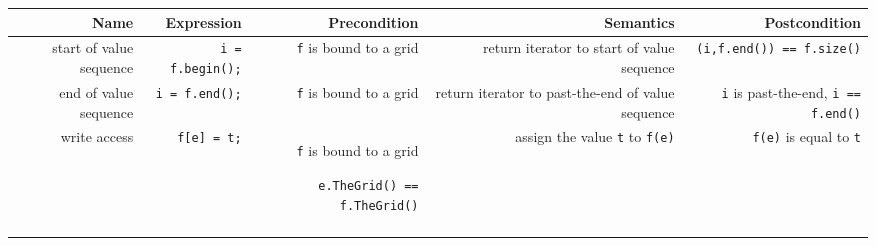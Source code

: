 \begin{tabularx}{15cm}{RRRRR} 
  \hline
  \bf  Name     &
  \bf  Expression &
  \bf  Precondition&
  \bf  Semantics &
  \bf  Postcondition
  \\
  \hline
  start of value sequence  &
  {\tt i = f.begin();} &
  {\tt f} is bound to a grid  &
  return iterator to start of value sequence &
  {\tt  {}(i,f.end()) == f.size()}
  \\ 
  end of value sequence  &
  {\tt i = f.end();} &
  {\tt f} is bound to a grid  &
  return iterator to past-the-end of value sequence &
  {\tt i} is past-the-end, {\tt i == f.end()}
  \\ 
  write access &
  {\tt f[e] = t;} &
  {\tt f} is bound to a grid
  \par {\tt e.TheGrid() == f.TheGrid()}
  &
  assign the value {\tt t} to {\tt f(e)} &
  {\tt f(e)} is equal to {\tt t}
  \\ 
  \hline
  \\
\end{tabularx}


\W{}

\W{}
    

 ~
 ~

  

